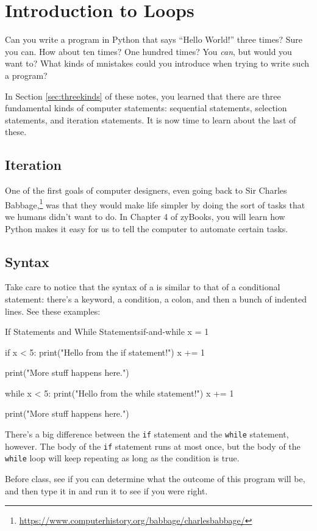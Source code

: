 
\chapter{Introduction to Loops}


\minitoc

Can you write a program in Python that says ``Hello World!'' three times?  Sure you can.  How about ten times?  One hundred times?  You \textit{can}, but would you want to?  What kinds of mnistakes could you introduce when trying to write such a program?

In Section \ref{sec:threekinds} of these notes, you learned that there are three fundamental kinds of computer statements: sequential statements, selection statements, and iteration statements.  It is now time to learn about the last of these.

\section{Iteration}

One of the first goals of computer designers, even going back to Sir Charles Babbage,\footnote{\url{https://www.computerhistory.org/babbage/charlesbabbage/}} was that they would make life simpler by doing the sort of tasks that we humans didn't want to do.  In Chapter 4 of zyBooks, you will learn how Python makes it easy for us to tell the computer to automate certain tasks.

\section{Syntax}

Take care to notice that the syntax of a  is similar to that of a conditional statement: there's a keyword, a condition, a colon, and then a bunch of indented lines.  See these examples:

\begin{py}{If Statements and While Statements}{if-and-while}
x = 1

if x < 5:
    print("Hello from the if statement!")
    x += 1

print("More stuff happens here.")

while x < 5:
    print("Hello from the while statement!")
    x += 1

print("More stuff happens here.")
\end{py}

There's a big difference between the \texttt{if} statement and the \texttt{while} statement, however.  The body of the \texttt{if} statement runs at most once, but the body of the \texttt{while} loop will keep repeating as long as the condition is true.

Before class, see if you can determine what the outcome of this program will be, and then type it in and run it to see if you were right.